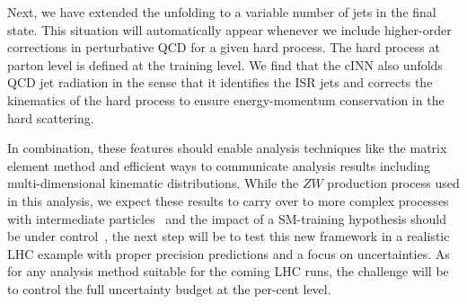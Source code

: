 Next, we have extended the unfolding to a variable number of jets in
the final state. This situation will automatically appear whenever we
include higher-order corrections in perturbative QCD for a given hard
process. The hard process at parton level is defined at the training
level. We find that the cINN also unfolds QCD jet radiation in the
sense that it identifies the ISR jets and corrects the kinematics of
the hard process to ensure energy-momentum conservation in the hard
scattering.

In combination, these features should enable analysis techniques like
the matrix element method and efficient ways to communicate analysis
results including multi-dimensional kinematic distributions. While the
$ZW$ production process used in this analysis, we expect these results
to carry over to more complex processes with intermediate
particles~\cite{gan_phasespace} and the impact of a SM-training
hypothesis should be under control~\cite{fcgan}, the next step will be
to test this new framework in a realistic LHC example with proper
precision predictions and a focus on uncertainties. As for any
analysis method suitable for the coming LHC runs, the challenge will
be to control the full uncertainty budget at the per-cent
level. 

%
